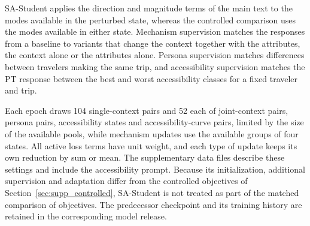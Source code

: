 SA-Student applies the direction and magnitude terms of the main text to the modes available in the perturbed state, whereas the controlled comparison uses the modes available in either state. Mechanism supervision matches the responses from a baseline to variants that change the context together with the attributes, the context alone or the attributes alone. Persona supervision matches differences between travelers making the same trip, and accessibility supervision matches the PT response between the best and worst accessibility classes for a fixed traveler and trip.

Each epoch draws 104 single-context pairs and 52 each of joint-context pairs, persona pairs, accessibility states and accessibility-curve pairs, limited by the size of the available pools, while mechanism updates use the available groups of four states. All active loss terms have unit weight, and each type of update keeps its own reduction by sum or mean. The supplementary data files describe these settings and include the accessibility prompt. Because its initialization, additional supervision and adaptation differ from the controlled objectives of Section~\ref{sec:supp_controlled}, SA-Student is not treated as part of the matched comparison of objectives. The predecessor checkpoint and its training history are retained in the corresponding model release.
\FloatBarrier
